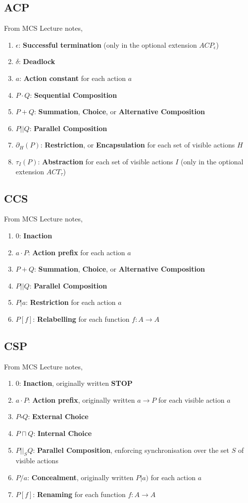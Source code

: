 \documentclass{article}
\begin{document}
\subsection{ACP}
From MCS Lecture notes,
\begin{enumerate}
    \item $\epsilon$: \textbf{Successful termination} (only in the optional extension $ACP_{\epsilon}$)
    \item $\delta$: \textbf{Deadlock}
    \item $a$: \textbf{Action constant} for each action $a$
    \item $P\cdot Q$: \textbf{Sequential Composition}
    \item $P + Q$: \textbf{Summation}, \textbf{Choice}, or \textbf{Alternative Composition}
    \item $P | | Q$: \textbf{Parallel Composition}
    \item $\partial_H(P)$: \textbf{Restriction}, or \textbf{Encapsulation} for each set of visible actions $H$
    \item $\tau_{I}(P)$: \textbf{Abstraction} for each set of visible actions $I$ (only in the optional extension $ACT_{\tau}$)
\end{enumerate}
\subsection{CCS}
From MCS Lecture notes,
\begin{enumerate}
    \item $0$: \textbf{Inaction}
    \item $a \cdot P$: \textbf{Action prefix} for each action $a$
    \item $P+Q$: \textbf{Summation}, \textbf{Choice}, or \textbf{Alternative Composition}
    \item $P | | Q$: \textbf{Parallel Composition}
    \item $P | a$: \textbf{Restriction} for each action $a$
    \item $P[f]$: \textbf{Relabelling} for each function $f : A \to A$
\end{enumerate}
\subsection{CSP}
From MCS Lecture notes,
\begin{enumerate}
    \item $0$: \textbf{Inaction}, originally written \textbf{STOP}
    \item $a \cdot P$: \textbf{Action prefix}, originally written $a \to P$ for each visible action $a$
    \item $P \square Q$: \textbf{External Choice}
    \item $P \sqcap Q$: \textbf{Internal Choice}
    \item $P | |_{S} Q$: \textbf{Parallel Composition}, enforcing synchronisation over the set $S$ of visible actions
    \item $P /a$: \textbf{Concealment}, originally written $P|a)$ for each action $a$
    \item $P[f]$: \textbf{Renaming} for each function $f : A \to A$
\end{enumerate}
\end{document}
